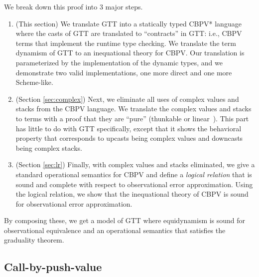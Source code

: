 \documentclass[acmsmall,screen,12pt]{acmart}
\newcommand{\cbpvstar}{CBPV*}
\begin{document}
We break down this proof into 3 major steps.
\begin{enumerate}
\item (This section) We translate GTT into a statically typed \cbpvstar\/
  language where the casts of GTT are translated to ``contracts'' in
  GTT: i.e., CBPV terms that implement the runtime type checking. We
  translate the term dynamism of GTT to an inequational theory for CBPV.
  Our translation is parameterized by the implementation of the dynamic
  types, and we demonstrate two valid implementations, one more direct
  and one more Scheme-like.
\item (Section \ref{sec:complex}) Next, we eliminate all uses of complex
  values and stacks from the CBPV language. We translate the complex
  values and stacks to terms with a proof that they are ``pure''
  (thunkable or linear~\cite{munchmaccagnoni14nonassociative}). This part has little to do with GTT
  specifically, except that it shows the behavioral property that
  corresponds to upcasts being complex values and downcasts being
  complex stacks.
\item (Section \ref{sec:lr}) Finally, with complex values and stacks
  eliminated, we give a standard operational semantics for CBPV and
  define a \emph{logical relation} that is sound and complete with
  respect to observational error approximation. Using the logical
  relation, we show that the inequational theory of CBPV is sound for
  observational error approximation.
\end{enumerate}

By composing these, we get a model of GTT where equidynamism is sound
for observational equivalence and an operational semantics that
satisfies the graduality theorem.

\subsection{Call-by-push-value}
\label{sec:cbpvstar}
\end{document}
